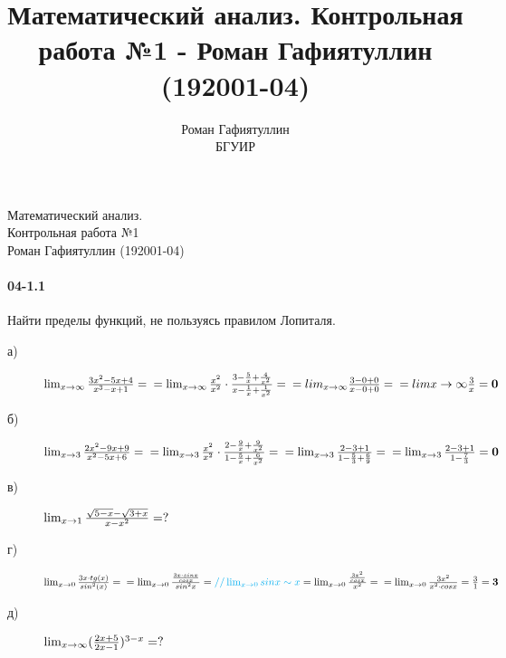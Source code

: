\documentclass[12pt]{article}
\title{Математический анализ. Контрольная работа №1 - Роман Гафиятуллин (192001-04)}
\author{Роман Гафиятуллин\\ БГУИР}
\begin{document}
	\begin{titlepage}
		\begin{center}
			{\Large Математический анализ. \\ Контрольная работа №1 \\ Роман Гафиятуллин (192001-04)}
		\end{center}
	\end{titlepage}
	\clearpage
	\paragraph{04-1.1} Найти пределы функций, не пользуясь правилом Лопиталя. \\
	\begin{description}
		\item[а)]
			\ensuremath{
				\lim_{x \to \infty} \frac{3 x ^2 - 5 x + 4}{x ^3 - x + 1} = \\
				= \lim_{x \to \infty} 
					\frac{x ^2}{x ^2} \cdot 
					\frac
						{ 3 - \frac{5}{x} + \frac{4}{x ^2} }
						{ x - \frac{1}{x} + \frac{1}{x ^2} }
				= \\
				= lim_{x \to \infty} 
					\frac
						{ 3 - 0 + 0 }
						{ x - 0 + 0 }
				= \\
				= lim{x \to \infty}
					\frac{3}{x} = {\bf 0}
			}
		\item[б)]
			\ensuremath{
				\lim_{x \to 3} \frac{2 x ^2 - 9 x + 9}{x ^2 - 5 x + 6} = \\
				= \lim_{x \to 3}
					\frac{x ^2}{x ^2} \cdot 
					\frac
						{2 - \frac{9}{x} + \frac{9}{x ^2} }
						{1 - \frac{5}{x} + \frac{6}{x ^2} } = \\
				= \lim_{x \to 3}
					\frac
						{ 2 - 3 + 1 }
						{ 1 - \frac{5}{3} + \frac{6}{9} } = \\
				= \lim_{x \to 3}
					\frac
						{ 2 - 3 + 1 }
						{ 1 - \frac{7}{3} } = {\bf 0}
			}
		\item[в)]
			\ensuremath{
				\lim_{x \to 1} \frac{\sqrt{5 - x} - \sqrt{3 + x}}{x - x ^2} = ? \\
			}
		\item[г)]
			\ensuremath{
				\lim_{x \to 0} \frac{3 x \cdot tg(x)}{sin ^2 (x)} = \\
				= \lim_{x \to 0} 
					\frac
						{ \frac{3 x \cdot sin x}{cos x}}
						{ sin ^2 x } = \\
				\textcolor{Cyan}{// \lim_{x \to 0} sin x \sim x } \\
				= \lim_{x \to 0}
					\frac
						{ \frac{ 3 x ^2 }{cos x} }
						{ x ^2 } = \\
				= \lim_{x \to 0}
					\frac
						{ 3 x ^2 }
						{ x ^2 \cdot cos x } = \frac{3}{1} = {\bf 3}
			}
		\item[д)]
			\ensuremath{
				\lim_{x \to \infty} (\frac{2 x + 5}{2 x - 1}) ^{3 - x} = ?\\
			}
	\end{description}
\end{document}
